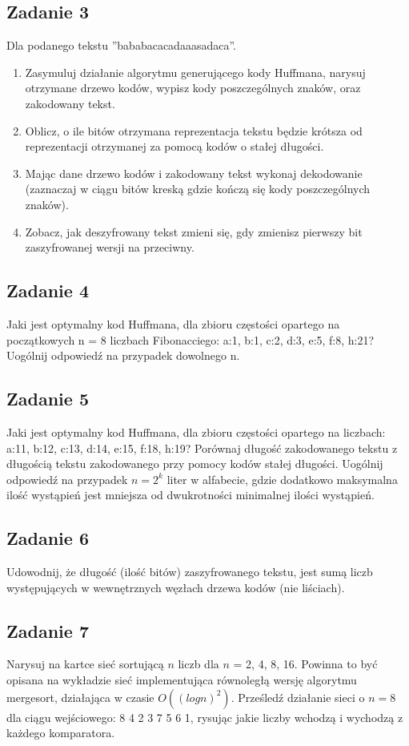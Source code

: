 \documentclass{article}
\begin{document}
\subsection*{Zadanie 3}
Dla podanego tekstu ”bababacacadaaasadaca”.
\begin{enumerate}[label=(\alph*)]
    \item Zasymuluj działanie algorytmu generującego kody Huffmana, narysuj otrzymane
          drzewo kodów, wypisz kody poszczególnych znaków, oraz zakodowany tekst.
    \item Oblicz, o ile bitów otrzymana reprezentacja tekstu będzie krótsza od reprezentacji
          otrzymanej za pomocą kodów o stałej długości.
    \item Mając dane drzewo kodów i zakodowany tekst wykonaj dekodowanie (zaznaczaj w
          ciągu bitów kreską gdzie kończą się kody poszczególnych znaków).
    \item Zobacz, jak deszyfrowany tekst zmieni się, gdy zmienisz pierwszy bit zaszyfrowanej
          wersji na przeciwny.
\end{enumerate}

\subsection*{Zadanie 4}
Jaki jest optymalny kod Huffmana, dla zbioru częstości opartego na początkowych n = 8
liczbach Fibonacciego: a:1, b:1, c:2, d:3, e:5, f:8, h:21?
Uogólnij odpowiedź na przypadek dowolnego n.

\subsection*{Zadanie 5}
Jaki jest optymalny kod Huffmana, dla zbioru częstości opartego na liczbach: a:11, b:12,
c:13, d:14, e:15, f:18, h:19? Porównaj długość zakodowanego tekstu z długością tekstu
zakodowanego przy pomocy kodów stałej długości.
Uogólnij odpowiedź na przypadek $n = 2^k$ liter w alfabecie, gdzie dodatkowo maksymalna
ilość wystąpień jest mniejsza od dwukrotności minimalnej ilości wystąpień.

\subsection*{Zadanie 6}
Udowodnij, że długość (ilość bitów) zaszyfrowanego tekstu, jest sumą liczb występujących w
wewnętrznych węzłach drzewa kodów (nie liściach).

\subsection*{Zadanie 7}
Narysuj na kartce sieć sortującą $n$ liczb dla $n$ = 2, 4, 8, 16. Powinna to być opisana na
wykładzie sieć implementująca równoległą wersję algorytmu mergesort, działająca w
czasie $O((log n)^2)$. Prześledź działanie sieci o $n = 8$ dla ciągu wejściowego: 8 4 2 3 7 5 6
1, rysując jakie liczby wchodzą i wychodzą z każdego komparatora.
\end{document}
